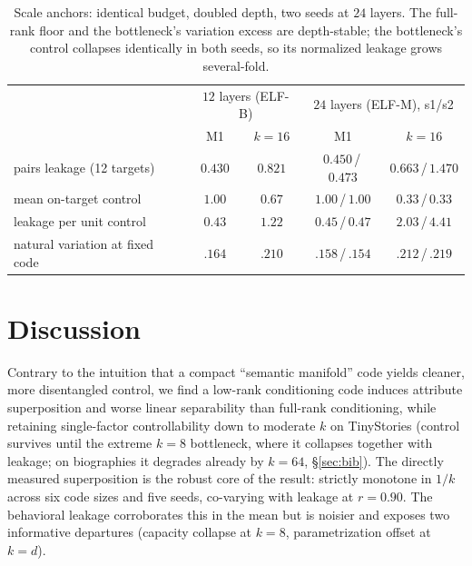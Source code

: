 \documentclass[11pt]{article}
\begin{document}
\begin{table}[h]\centering\small
\begin{tabular}{l cc cc}
& \multicolumn{2}{c}{$12$ layers (ELF-B)} & \multicolumn{2}{c}{$24$ layers (ELF-M), s1/s2} \\
& M1 & $k{=}16$ & M1 & $k{=}16$ \\
\hline
pairs leakage (12 targets)      & $0.430$ & $0.821$ & $0.450$\,/\,$0.473$ & $0.663$\,/\,$1.470$ \\
mean on-target control          & $1.00$  & $0.67$  & $1.00$\,/\,$1.00$   & $0.33$\,/\,$0.33$  \\
leakage per unit control        & $0.43$  & $1.22$  & $0.45$\,/\,$0.47$   & $2.03$\,/\,$4.41$  \\
natural variation at fixed code & $.164$  & $.210$  & $.158$\,/\,$.154$   & $.212$\,/\,$.219$  \\
\end{tabular}
\caption{Scale anchors: identical budget, doubled depth, two seeds at
$24$ layers. The full-rank floor and the bottleneck's variation excess
are depth-stable; the bottleneck's control collapses identically in
both seeds, so its normalized leakage grows several-fold.}
\label{tab:elfm}
\end{table}

\section{Discussion}
Contrary to the intuition that a compact ``semantic manifold'' code yields cleaner,
more disentangled control, we find a low-rank conditioning code induces attribute
superposition and worse linear separability than full-rank conditioning, while
retaining single-factor controllability down to moderate $k$ on TinyStories
(control survives until the extreme $k{=}8$ bottleneck, where it collapses
together with leakage; on biographies it degrades already by $k{=}64$,
\S\ref{sec:bib}). The
directly measured superposition is the robust core of the result: strictly monotone
in $1/k$ across six code sizes and five seeds, co-varying with leakage at $r{=}0.90$.
The behavioral leakage corroborates this in the mean but is noisier and exposes two
informative departures (capacity collapse at $k{=}8$, parametrization offset at
$k{=}d$).
\end{document}

